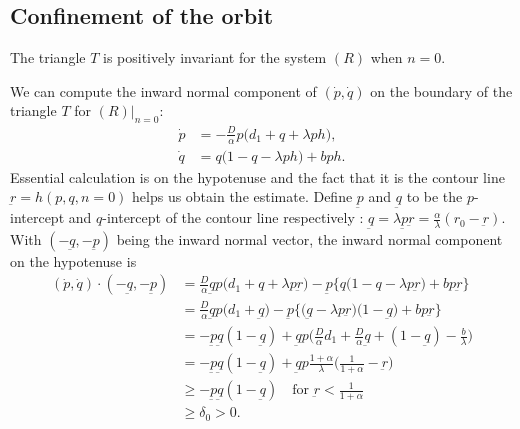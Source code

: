 \documentclass[graybox]{svmult}
\begin{document}
\subsection{Confinement of the orbit}
\begin{lemma}
The triangle $T$  is positively invariant for the system $(R)$ when $n=0$.
\end{lemma}
We can compute the inward normal component of $(\dot{p},\dot{q})$ on the boundary of the triangle $T$ for $(R)|_{n=0}$:
\begin{align*}
 \dot{p} &= -\frac{D}{\alpha} p\Big(d_1+q+\lambda p h\Big),\\
 \dot{q} &= q\Big(1-q-\lambda p h\Big) + b p h.
\end{align*}
Essential calculation is on the hypotenuse and the fact that it is the contour line $\underbar{r}=h(p,q,n=0)$ helps us obtain the estimate. Define $\underbar{p}$ and $\underbar{q}$ to be the $p$-intercept and $q$-intercept of the contour line respectively : $\underbar{q} = \lambda \underbar{p}\underbar{r} = \frac{\alpha}{\lambda}(r_0-\underbar{r})$. With  $(-\underbar{q},-\underbar{p})$ being the inward normal vector, the  inward normal component on the hypotenuse is 
\begin{align*}
    (\dot{p},\dot{q}) \cdot (-\underbar{q},-\underbar{p}) &= \frac{D}{\alpha}\underbar{q}p\Big(d_1 + q + \lambda p \underbar{r}\Big) -\underbar{p}\bigg\{q\Big(1-q-\lambda p \underbar{r}\Big) + b p \underbar{r}\bigg\}\\
    &=\frac{D}{\alpha}\underbar{q}p\Big(d_1 +\underbar{q}\Big) -\underbar{p}\bigg\{\Big(\underbar{q}-\lambda p \underbar{r}\Big)\Big(1-\underbar{q}\Big) + b p \underbar{r}\bigg\}\\
    &=-\underbar{p}\underbar{q}(1-\underbar{q}) + \underbar{q}p\Big(\frac{D}{\alpha}d_1 + \frac{D}{\alpha}\underbar{q} + (1-\underbar{q}) - \frac{b}{\lambda}\Big)\\
    &=-\underbar{p}\underbar{q}(1-\underbar{q}) + \underbar{q}p\frac{1+\alpha}{\lambda}\Big(\frac{1}{1+\alpha}-\underbar{r}\Big)\\
    &\ge -\underbar{p}\underbar{q}(1-\underbar{q}) \quad \text{for $\underbar{r} < \frac{1}{1+\alpha}$}\\
    &\ge \delta_0 > 0.
\end{align*}
\end{document}
